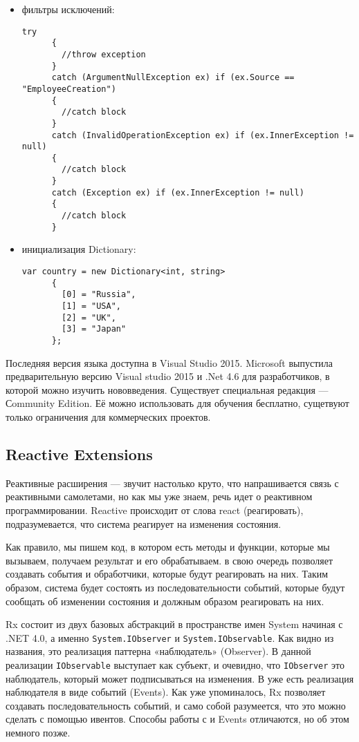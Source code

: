 \begin{itemize}
  \item фильтры исключений:
    \begin{lstlisting}[style=csharpinlinestyle]
      try
      {
        //throw exception
      }
      catch (ArgumentNullException ex) if (ex.Source == "EmployeeCreation")
      {
        //catch block
      }
      catch (InvalidOperationException ex) if (ex.InnerException != null)
      {
        //catch block
      }
      catch (Exception ex) if (ex.InnerException != null)
      {
        //catch block
      }
    \end{lstlisting}
  \item инициализация Dictionary:
    \begin{lstlisting}[style=csharpinlinestyle]
      var country = new Dictionary<int, string>
      {
        [0] = "Russia",
        [1] = "USA",
        [2] = "UK",
        [3] = "Japan"
      };
    \end{lstlisting}
\end{itemize}

Последняя версия языка доступна в Visual Studio 2015. Microsoft выпустила предварительную версию Visual studio 2015 и .Net 4.6 для разработчиков,
в которой можно изучить нововведения. Существует специальная редакция --- Сommunity Edition. Её можно использовать для обучения бесплатно, сущетвуют только ограничения для коммерческих проектов.

\subsection{Reactive Extensions}
\label{sub:practice:reactive_extensions}

Реактивные расширения — звучит настолько круто, что напрашивается связь с реактивными самолетами, но как мы уже знаем, речь идет о реактивном программировании.
Reactive происходит от слова react (реагировать), подразумевается, что система реагирует на изменения состояния.

Как правило, мы пишем код, в котором есть методы и функции, которые мы вызываем, получаем результат и его обрабатываем. \rx{} в свою очередь позволяет создавать события и обработчики,
которые будут реагировать на них. Таким образом, система будет состоять из последовательности событий, которые будут сообщать об изменении состояния и должным образом реагировать на них.

Rx состоит из двух базовых абстракций в пространстве имен System начиная с .NET 4.0, а именно \lstinline[style=csharpinlinestyle]!System.IObserver! и \lstinline[style=csharpinlinestyle]!System.IObservable!.
Как видно из названия, это реализация паттерна «наблюдатель» (Observer). В данной реализации \lstinline[style=csharpinlinestyle]!IObservable! выступает как субъект,
и очевидно, что \lstinline[style=csharpinlinestyle]!IObserver! это наблюдатель, который может подписываться на изменения.
В \dotnet{} уже есть реализация наблюдателя в виде событий (Events). Как уже упоминалось, Rx позволяет создавать последовательность событий, и само собой разумеется,
что это можно сделать с помощью ивентов. Способы работы с \rx{} и Events отличаются, но об этом немного позже.

